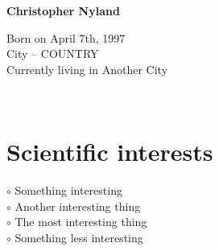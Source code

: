 \documentclass[a4paper,10pt]{article}
\begin{document}
\thispagestyle{empty}

\begin{adjustbox}{valign=t}
\begin{minipage}{0.3\textwidth} %
\begin{center}

\MySkip 	%

{\LARGE \bfseries Christopher Nyland}

\MySkip 	%

Born on April 7th, 1997\\
City -- COUNTRY\\
Currently living in Another City\\

\MySkip 	%

\textcolor{ColorTwo}{\faEnvelopeO} 
 \\

\textcolor{ColorTwo}{\faChain} 
\end{center}

\vfill

\section*{Scientific interests}
\raggedright
\textcolor{ColorOne}{$\circ$} Something interesting\\
\textcolor{ColorOne}{$\circ$} Another interesting thing\\
\textcolor{ColorOne}{$\circ$} The most interesting thing\\
\textcolor{ColorOne}{$\circ$} Something less interesting


\end{minipage}
\end{adjustbox}
\end{document}
